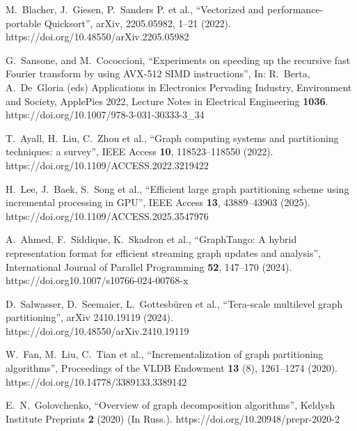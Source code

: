 \documentclass[
11pt,%
tightenlines,%
twoside,%
onecolumn,%
nofloats,%
nobibnotes,%
nofootinbib,%
superscriptaddress,%
noshowpacs,%
centertags]%
{revtex4}
\begin{document}
\begin{thebibliography}{99}
M.~Blacher, J.~Giesen, P.~Sanders P. et al., \textquotedblleft Vectorized and performance-portable Quicksort\textquotedblright, arXiv, 2205.05982, 1--21 (2022). https://doi.org/10.48550/arXiv.2205.05982

G.~Sansone, and M.~Cococcioni, \textquotedblleft Experiments on speeding up the recursive fast Fourier transform by using AVX-512 SIMD instructions\textquotedblright, In: R.~Berta, A.~De~Gloria (eds) Applications in Electronics Pervading Industry, Environment and Society, ApplePies 2022, Lecture Notes in Electrical Engineering \textbf{1036}. https://doi.org/10.1007/978-3-031-30333-3\_34


T.~Ayall, H.~Liu, C.~Zhou et al., \textquotedblleft Graph computing systems and partitioning techniques: a survey\textquotedblright, IEEE Access \textbf{10}, 118523--118550 (2022). https://doi.org/10.1109/ACCESS.2022.3219422

H.~Lee, J.~Baek, S.~Song et al., \textquotedblleft Efficient large graph partitioning scheme using incremental processing in GPU\textquotedblright, IEEE Access \textbf{13}, 43889--43903 (2025). https://doi.org/10.1109/ACCESS.2025.3547976

A.~Ahmed, F.~Siddique, K.~Skadron et al., \textquotedblleft GraphTango: A hybrid representation format for efficient streaming graph updates and analysis\textquotedblright, International Journal of Parallel Programming \textbf{52}, 147--170 (2024). https://doi.org10.1007/s10766-024-00768-x

D.~Salwasser, D.~Seemaier, L.~Gottesb\"uren et al., \textquotedblleft Tera-scale multilevel graph partitioning\textquotedblright, arXiv 2410.19119 (2024). https://doi.org/10.48550/arXiv.2410.19119

W.~Fan, M.~Liu, C.~Tian et al., \textquotedblleft Incrementalization of graph partitioning algorithms\textquotedblright, Proceedings of the VLDB Endowment \textbf{13} (8), 1261--1274 (2020). https://doi.org/10.14778/3389133.3389142

E.~N.~Golovchenko, \textquotedblleft Overview of graph decomposition algorithms\textquotedblright, Keldysh Institute Preprints \textbf{2} (2020) (In Russ.). https://doi.org/10.20948/prepr-2020-2


\end{thebibliography}
\end{document}

